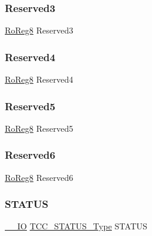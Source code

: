 \mbox{\label{struct_tcc_a04871068e4c9aaff01e365b7b670bde9}} 
\subsubsection{\texorpdfstring{Reserved3}{Reserved3}}
{\footnotesize\ttfamily \mbox{\hyperlink{group___s_a_m_d21_e15_a__definitions_ga0d957f1433aaf5d70e4dc2b68288442d}{Ro\+Reg8}} Reserved3}

\mbox{\label{struct_tcc_afdb8a8dce919f0c98e4427301fb81799}} 
\subsubsection{\texorpdfstring{Reserved4}{Reserved4}}
{\footnotesize\ttfamily \mbox{\hyperlink{group___s_a_m_d21_e15_a__definitions_ga0d957f1433aaf5d70e4dc2b68288442d}{Ro\+Reg8}} Reserved4}

\mbox{\label{struct_tcc_a2d9b47c3fd63e946e1e94e1a64ebf163}} 
\subsubsection{\texorpdfstring{Reserved5}{Reserved5}}
{\footnotesize\ttfamily \mbox{\hyperlink{group___s_a_m_d21_e15_a__definitions_ga0d957f1433aaf5d70e4dc2b68288442d}{Ro\+Reg8}} Reserved5}

\mbox{\label{struct_tcc_acb4c89ce95041141d5c215027bd15bb1}} 
\subsubsection{\texorpdfstring{Reserved6}{Reserved6}}
{\footnotesize\ttfamily \mbox{\hyperlink{group___s_a_m_d21_e15_a__definitions_ga0d957f1433aaf5d70e4dc2b68288442d}{Ro\+Reg8}} Reserved6}

\mbox{\label{struct_tcc_af6917afcdf62cd2447e23fd6233aee35}} 
\subsubsection{\texorpdfstring{STATUS}{STATUS}}
{\footnotesize\ttfamily \mbox{\hyperlink{core__cm0plus_8h_aec43007d9998a0a0e01faede4133d6be}{\+\_\+\+\_\+\+IO}} \mbox{\hyperlink{union_t_c_c___s_t_a_t_u_s___type}{T\+C\+C\+\_\+\+S\+T\+A\+T\+U\+S\+\_\+\+Type}} S\+T\+A\+T\+US}



